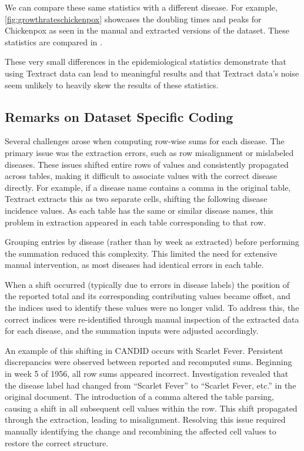 \documentclass[12pt]{article}
\begin{document}
We can compare these same statistics with a different disease. For example, \cref{fig:growthrateschickenpox} showcases the doubling times and peaks for Chickenpox as seen in the manual and extracted versions of the dataset. These statistics are compared in .

These very small differences in the epidemiological statistics demonstrate that using Textract data can lead to meaningful results and that Textract data's noise seem unlikely to heavily skew the results of these statistics.


\subsection{Remarks on Dataset Specific Coding}\label{sec:hardcoding}

Several challenges arose when computing row-wise sums for each disease. The primary issue was the extraction errors, such as row misalignment or mislabeled diseases. These issues shifted entire rows of values and consistently propagated across tables, making it difficult to associate values with the correct disease directly. For example, if a disease name contains a comma in the original table, Textract extracts this as two separate cells, shifting the following disease incidence values. As each table has the same or similar disease names, this problem in extraction appeared in each table corresponding to that row. 

Grouping entries by disease (rather than by week as extracted) before performing the summation reduced this complexity. This limited the need for extensive manual intervention, as most diseases had identical errors in each table.

When a shift occurred (typically due to errors in disease labels) the position of the reported total and its corresponding contributing values became offset, and the indices used to identify these values were no longer valid. To address this, the correct indices were re-identified through manual inspection of the extracted data for each disease, and the summation inputs were adjusted accordingly.

An example of this shifting in CANDID occurs with Scarlet Fever. Persistent discrepancies were observed between reported and recomputed sums. Beginning in week 5 of 1956, all row sums appeared incorrect. Investigation revealed that the disease label had changed from ``Scarlet Fever” to ``Scarlet Fever, etc.” in the original document. The introduction of a comma altered the table parsing, causing a shift in all subsequent cell values within the row. This shift propagated through the extraction, leading to misalignment. Resolving this issue required manually identifying the change and recombining the affected cell values to restore the correct structure.
\end{document}
